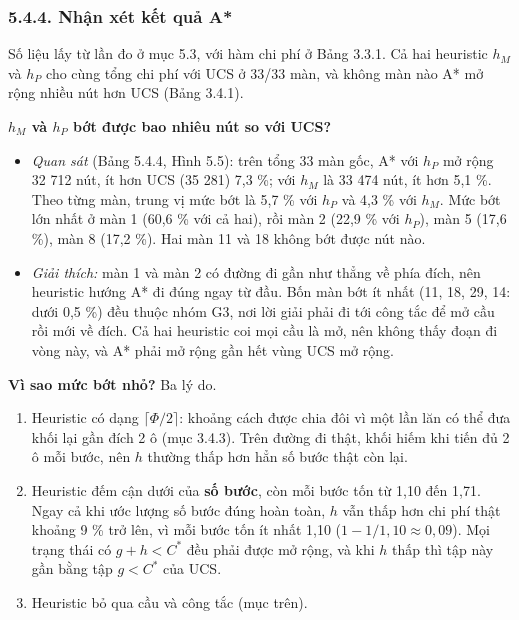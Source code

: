 \subsubsection{5.4.4. Nhận xét kết quả A*}

Số liệu lấy từ lần đo ở mục 5.3, với hàm chi phí ở Bảng 3.3.1. Cả hai heuristic \(h_M\) và \(h_P\) cho cùng tổng chi phí với UCS ở 33/33 màn, và không màn nào A* mở rộng nhiều nút hơn UCS (Bảng 3.4.1).

\textbf{\(h_M\) và \(h_P\) bớt được bao nhiêu nút so với UCS?}

\begin{itemize}
\tightlist
\item
  \emph{Quan sát} (Bảng 5.4.4, Hình 5.5): trên tổng 33 màn gốc, A* với \(h_P\) mở rộng 32 712 nút, ít hơn UCS (35 281) 7,3 \%; với \(h_M\) là 33 474 nút, ít hơn 5,1 \%. Theo từng màn, trung vị mức bớt là 5,7 \% với \(h_P\) và 4,3 \% với \(h_M\). Mức bớt lớn nhất ở màn 1 (60,6 \% với cả hai), rồi màn 2 (22,9 \% với \(h_P\)), màn 5 (17,6 \%), màn 8 (17,2 \%). Hai màn 11 và 18 không bớt được nút nào.
\item
  \emph{Giải thích:} màn 1 và màn 2 có đường đi gần như thẳng về phía đích, nên heuristic hướng A* đi đúng ngay từ đầu. Bốn màn bớt ít nhất (11, 18, 29, 14: dưới 0,5 \%) đều thuộc nhóm G3, nơi lời giải phải đi tới công tắc để mở cầu rồi mới về đích. Cả hai heuristic coi mọi cầu là mở, nên không thấy đoạn đi vòng này, và A* phải mở rộng gần hết vùng UCS mở rộng.
\end{itemize}

\textbf{Vì sao mức bớt nhỏ?} Ba lý do.

\begin{enumerate}
\def\labelenumi{\arabic{enumi}.}
\tightlist
\item
  Heuristic có dạng \(\lceil \Phi/2 \rceil\): khoảng cách được chia đôi vì một lần lăn có thể đưa khối lại gần đích 2 ô (mục 3.4.3). Trên đường đi thật, khối hiếm khi tiến đủ 2 ô mỗi bước, nên \(h\) thường thấp hơn hẳn số bước thật còn lại.
\item
  Heuristic đếm cận dưới của \textbf{số bước}, còn mỗi bước tốn từ 1,10 đến 1,71. Ngay cả khi ước lượng số bước đúng hoàn toàn, \(h\) vẫn thấp hơn chi phí thật khoảng 9 \% trở lên, vì mỗi bước tốn ít nhất 1,10 (\(1 - 1/1{,}10 \approx 0{,}09\)). Mọi trạng thái có \(g + h < C^*\) đều phải được mở rộng, và khi \(h\) thấp thì tập này gần bằng tập \(g < C^*\) của UCS.
\item
  Heuristic bỏ qua cầu và công tắc (mục trên).
\end{enumerate}

